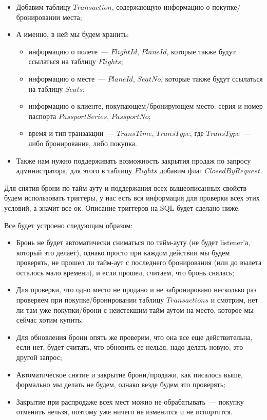 \documentclass[11pt,a4paper,oneside]{article}
\begin{document}
\begin{itemize}
  \item Добавим таблицу $Transaction$, содержающую информацию о покупке/бронировании места;
  \item А именно, в ней мы будем хранить:
    \begin{itemize}
      \item информацию о полете~--- $FlightId$, $PlaneId$, которые также будут ссылаться на таблицу $Flights$;
      \item информацию о месте~--- $PlaneId$, $SeatNo$, которые также будут ссылаться на таблицу $Seats$;
      \item информацию о клиенте, покупающем/бронирующем место: серия и номер паспорта $PassportSeries$, $PassportNo$;
      \item время и тип транзакции~--- $TransTime$, $TransType$, где $TransType$~--- либо бронирование, либо покупка.
    \end{itemize}
  \item Также нам нужно поддерживать возможность закрытия продаж по запросу администратора, для этого в таблицу $Flights$ добавим флаг
        $ClosedByRequest$.
\end{itemize}

Для снятия брони по тайм-ауту и поддержания всех вышеописанных свойств будем использовать триггеры, у нас есть вся информация для проверки всех этих условий, а значит все ок. Описание триггеров на SQL будет сделано ниже.

Все будет устроено следующим образом:

\begin{itemize}
  \item Бронь не будет автоматически сниматься по тайм-ауту (не будет listener'а, который это делает), однако просто при каждом действии мы будем проверять, не прошел ли тайм-аут с последнего бронирования (или до вылета осталось мало времени), и если прошел, считаем, что бронь снялась;
  \item Для проверки, что одно место не продано и не забронировано несколько раз проверяем при покупке/бронировании таблицу $Transactions$ и смотрим, нет ли там уже покупки/брони с неистекшим тайм-аутом на место, которое мы сейчас хотим купить;
  \item Для обновления брони опять же проверим, что она все еще действительна, если нет, будет считать, что обновить ее нельзя, надо делать новую, это другой запрос;
  \item Автоматическое снятие и закрытие брони/продажи, как писалось выше, формально мы делать не будем, однако везде будем это проверять;
  \item Закрытие при распродаже всех мест можно не обрабатывать~--- покупку отменить нельзя, поэтому уже ничего не изменится и не испортится.
\end{itemize}
\end{document}
